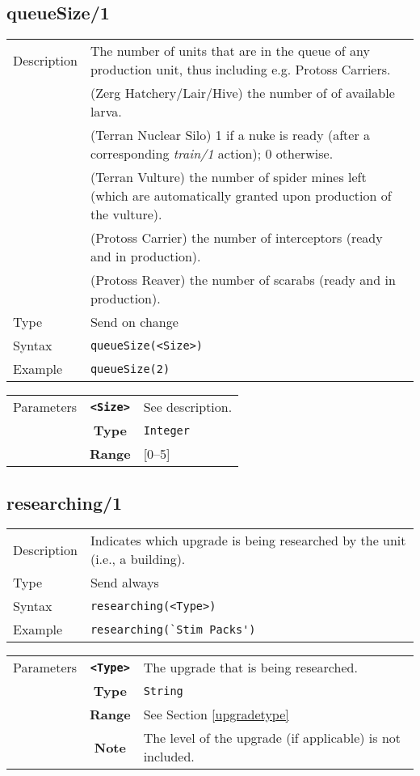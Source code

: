 \subsection{queueSize/1}
\begin{tabularx}{\textwidth}{lX}
 Description & The number of units that are in the queue of any production unit, thus including e.g. Protoss Carriers.\\
 & (Zerg Hatchery/Lair/Hive) the number of of available larva.\\
 & (Terran Nuclear Silo) 1 if a nuke is ready (after a corresponding \textit{train/1} action); 0 otherwise.\\
 & (Terran Vulture) the number of spider mines left (which are automatically granted upon production of the vulture).\\
 & (Protoss Carrier) the number of interceptors (ready and in production).\\
 & (Protoss Reaver) the number of scarabs (ready and in production).\\
 Type & Send on change \\
 Syntax & \verb|queueSize(<Size>)| \\
 Example & \verb|queueSize(2)| \\
 \end{tabularx}
 \begin{tabularx}{\textwidth}{l | c | p{8cm}|}
 \cline{2-3}
 Parameters & \textbf{\verb|<Size>|} & See description. \\
            & \textbf{Type} & \verb|Integer| \\
            & \textbf{Range} & [0--5] \\
            \cline{2-3}
\end{tabularx}

\subsection{researching/1}
\begin{tabularx}{\textwidth}{lX}
 Description & Indicates which upgrade is being researched by the unit (i.e., a building). \\
 Type & Send always \\
 Syntax & \verb|researching(<Type>)| \\
 Example & \verb|researching(`Stim Packs')| \\
 \end{tabularx}
 \begin{tabularx}{\textwidth}{l | c | p{8cm}|}
 \cline{2-3}
 Parameters & \textbf{\verb|<Type>|} & The upgrade that is being researched. \\
            & \textbf{Type} & \verb|String| \\
            & \textbf{Range} & See Section \ref{upgradetype} \\
 			& \textbf{Note} & The level of the upgrade (if applicable) is not included. \\
            \cline{2-3}
\end{tabularx}

